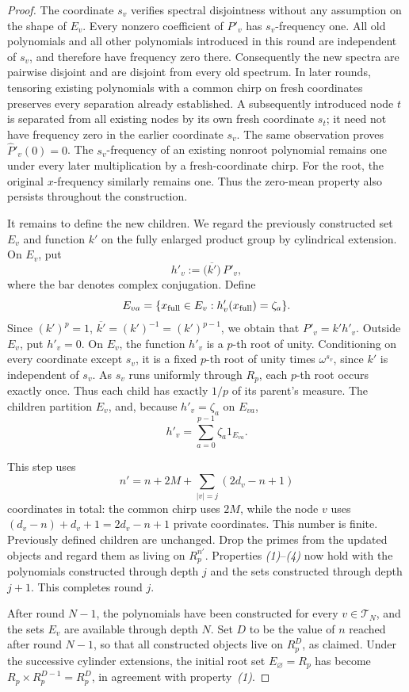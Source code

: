 \documentclass[11pt]{amsart}
\theoremstyle{definition}
\theoremstyle{remark}
\newcommand{\R}{R}
\newcommand{\T}{\mathcal T}
\begin{document}
\begin{proof}
The coordinate \(s_v\) verifies spectral disjointness without any
assumption on the shape of \(E_v\). Every nonzero coefficient of
\(P'_v\) has \(s_v\)-frequency one. All old polynomials and all
other polynomials introduced in this round are independent of
\(s_v\), and therefore
have frequency zero there. Consequently the new spectra are
pairwise disjoint and are disjoint from every old spectrum.
In later rounds, tensoring existing polynomials with a common chirp
on fresh coordinates preserves every separation already established.
A subsequently introduced node \(t\) is separated from all existing
nodes by its own fresh coordinate \(s_t\); it need not have
frequency zero in the earlier coordinate \(s_v\).
The same observation proves \(\widehat P'_v(0)=0\).
The \(s_v\)-frequency of an existing nonroot polynomial remains one
under every later multiplication by a fresh-coordinate chirp.
For the root, the original \(x\)-frequency similarly remains one.
Thus the zero-mean property also persists throughout the construction.

It remains to define the new children. 
We regard the previously constructed set \(E_v\) and function \(k'\) on the fully enlarged product group by cylindrical extension. On \(E_v\), put
\[
 h'_v:=\overline{\bigl(k'\bigr)}\,P'_v,
\]
where the bar denotes complex conjugation.
Define
\[
 E_{va}=\{x_{\rm full}\in E_v:h'_v(x_{\rm full})=\zeta_a\}.
\]
Since \((k')^p=1\),
\(\overline{k'}=(k')^{-1}=(k')^{p-1}\), we obtain that \(P'_v=k'h'_v\).
Outside \(E_v\), put \(h'_v=0\).
On \(E_v\), the function \(h'_v\) is a \(p\)-th root of unity.
Conditioning on every coordinate except \(s_v\), it is a fixed
\(p\)-th root of unity times \(\omega^{s_v}\), since \(k'\) is
independent of \(s_v\). As \(s_v\) runs uniformly through \(\R_p\),
each \(p\)-th root occurs exactly once. Thus each child has exactly
\(1/p\) of its parent's measure. The children partition \(E_v\), and,
because \(h'_v=\zeta_a\) on \(E_{va}\),
\[
 h'_v=\sum_{a=0}^{p-1}\zeta_a1_{E_{va}}.
\]

This step uses
\[
 n'=n+2M+\sum_{|v|=j}(2d_v-n+1)
\]
coordinates in total: the common chirp uses \(2M\), while the node
\(v\) uses \((d_v-n)+d_v+1=2d_v-n+1\) private coordinates. This
number is finite.
Previously defined children are unchanged. Drop the primes from the
updated objects and regard them as living on \(\R_p^{n'}\). Properties
\emph{(1)}--\emph{(4)} now hold with the polynomials constructed
through depth \(j\) and the sets constructed through depth \(j+1\).
This completes round \(j\).

After round \(N-1\), the polynomials have been constructed for every
\(v\in\T_N\), and the sets \(E_v\) are available through depth \(N\).
Set \(D\) to be the value of \(n\) reached after round \(N-1\), so
that all constructed objects live on \(\R_p^D\), as claimed.
Under the successive cylinder extensions, the initial root set
\(E_\varnothing=\R_p\) has become
\(\R_p\times\R_p^{D-1}=\R_p^D\), in agreement with property~\emph{(1)}.
\end{proof}
\end{document}
